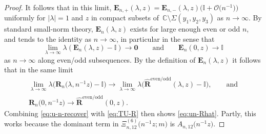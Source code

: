 \documentclass[pdftex]{sigma}
\numberwithin{equation}{section}
\newcommand{\C}{{\mathbb{C}}}
\begin{document}
\begin{proof}
It follows that in this limit, $\mathbf{E}_{n,+}(\lambda,z)=\mathbf{E}_{n,-}(\lambda,z)\big(\mathbb{I}+\mathcal{O}\big(n^{-1}\big)\big)$ uniformly for $|\lambda|=1$ and $z$ in compact subsets of~$\C\setminus \Sigma(y_1, y_2, y_3)$ as $n\to\infty$. By standard small-norm theory, $\mathbf{E}_n(\lambda,z)$ exists for large enough even or odd $n$, and tends to the identity as $n\to\infty$, in particular in the sense that
\begin{equation*}
 \lim_{\lambda\to\infty}\lambda(\mathbf{E}_n(\lambda,z)-\mathbb{I})\to\mathbf{0}\qquad\text{and}\qquad\mathbf{E}_n(0,z)\to\mathbb{I}
\end{equation*}
as $n\to\infty$ along even/odd subsequences. By the definition of $\mathbf{E}_n(\lambda,z)$ it follows that in the same limit
\begin{gather*}
 \lim_{\lambda\to\infty}\lambda\big(\mathbf{R}_n\big(\lambda,n^{-1}z\big)-\mathbb{I}\big)\to\lim_{\lambda\to\infty}\lambda\big(\hat{\mathbf{R}}^\mathrm{even/odd}(\lambda,z)-\mathbb{I}\big), \qquad \text{and}\\
 \mathbf{R}_n\big(0,n^{-1}z\big)\to\hat{\mathbf{R}}^\mathrm{even/odd}(0,z).
\end{gather*}
Combining \eqref{eq:u-n-recover} with \eqref{eq:TU-R} then shows \eqref{eq:un-Rhat}.
Partly, this works because the dominant term in $\Xi_{n,12}^{(6)}\big(n^{-1}z;m\big)$ is $A_{n,12}\big(n^{-1}z\big)$.
\end{proof}
\end{document}
